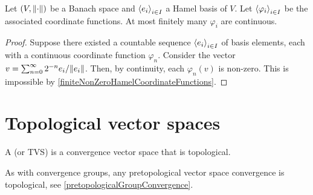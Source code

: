 \begin{proposition}
Let $\left( V,\lVert\cdot\rVert \right)$ be a Banach space and $\left\langle e_i \right\rangle_{i\in I}$ a Hamel basis of $V$. Let $\left\langle \varphi_i \right\rangle_{i\in I}$ be the associated coordinate functions. At most finitely many $\varphi_i$ are continuous.
\end{proposition}
\begin{proof}
Suppose there existed a countable sequence $\left\langle e_i \right\rangle_{i\in I}$ of basis elements, each with a continuous coordinate function $\varphi_n$. Consider the vector $v = \sum_{n=0}^\infty 2^{-n}e_i/\lVert e_i\rVert$. Then, by continuity, each $\varphi_n(v)$ is non-zero. This is impossible by \ref{finiteNonZeroHamelCoordinateFunctions}.
\end{proof}



\section{Topological vector spaces}
\begin{definition}
A  (or TVS) is a convergence vector space that is topological.
\end{definition}
As with convergence groups, any pretopological vector space convergence is topological, see \ref{pretopologicalGroupConvergence}.


